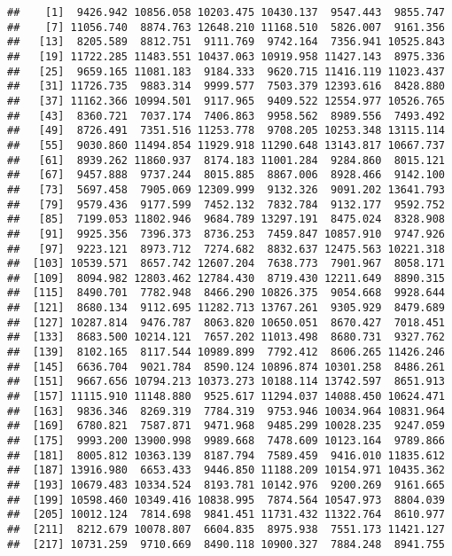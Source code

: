 \documentclass[]{article}
\begin{document}
\begin{verbatim}
##    [1]  9426.942 10856.058 10203.475 10430.137  9547.443  9855.747
##    [7] 11056.740  8874.763 12648.210 11168.510  5826.007  9161.356
##   [13]  8205.589  8812.751  9111.769  9742.164  7356.941 10525.843
##   [19] 11722.285 11483.551 10437.063 10919.958 11427.143  8975.336
##   [25]  9659.165 11081.183  9184.333  9620.715 11416.119 11023.437
##   [31] 11726.735  9883.314  9999.577  7503.379 12393.616  8428.880
##   [37] 11162.366 10994.501  9117.965  9409.522 12554.977 10526.765
##   [43]  8360.721  7037.174  7406.863  9958.562  8989.556  7493.492
##   [49]  8726.491  7351.516 11253.778  9708.205 10253.348 13115.114
##   [55]  9030.860 11494.854 11929.918 11290.648 13143.817 10667.737
##   [61]  8939.262 11860.937  8174.183 11001.284  9284.860  8015.121
##   [67]  9457.888  9737.244  8015.885  8867.006  8928.466  9142.100
##   [73]  5697.458  7905.069 12309.999  9132.326  9091.202 13641.793
##   [79]  9579.436  9177.599  7452.132  7832.784  9132.177  9592.752
##   [85]  7199.053 11802.946  9684.789 13297.191  8475.024  8328.908
##   [91]  9925.356  7396.373  8736.253  7459.847 10857.910  9747.926
##   [97]  9223.121  8973.712  7274.682  8832.637 12475.563 10221.318
##  [103] 10539.571  8657.742 12607.204  7638.773  7901.967  8058.171
##  [109]  8094.982 12803.462 12784.430  8719.430 12211.649  8890.315
##  [115]  8490.701  7782.948  8466.290 10826.375  9054.668  9928.644
##  [121]  8680.134  9112.695 11282.713 13767.261  9305.929  8479.689
##  [127] 10287.814  9476.787  8063.820 10650.051  8670.427  7018.451
##  [133]  8683.500 10214.121  7657.202 11013.498  8680.731  9327.762
##  [139]  8102.165  8117.544 10989.899  7792.412  8606.265 11426.246
##  [145]  6636.704  9021.784  8590.124 10896.874 10301.258  8486.261
##  [151]  9667.656 10794.213 10373.273 10188.114 13742.597  8651.913
##  [157] 11115.910 11148.880  9525.617 11294.037 14088.450 10624.471
##  [163]  9836.346  8269.319  7784.319  9753.946 10034.964 10831.964
##  [169]  6780.821  7587.871  9471.968  9485.299 10028.235  9247.059
##  [175]  9993.200 13900.998  9989.668  7478.609 10123.164  9789.866
##  [181]  8005.812 10363.139  8187.794  7589.459  9416.010 11835.612
##  [187] 13916.980  6653.433  9446.850 11188.209 10154.971 10435.362
##  [193] 10679.483 10334.524  8193.781 10142.976  9200.269  9161.665
##  [199] 10598.460 10349.416 10838.995  7874.564 10547.973  8804.039
##  [205] 10012.124  7814.698  9841.451 11731.432 11322.764  8610.977
##  [211]  8212.679 10078.807  6604.835  8975.938  7551.173 11421.127
##  [217] 10731.259  9710.669  8490.118 10900.327  7884.248  8941.755

\end{verbatim}
\end{document}
